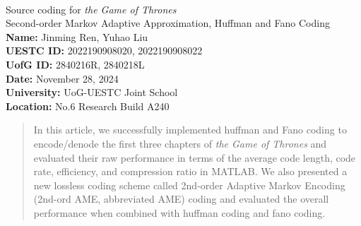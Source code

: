 \documentclass[12pt,twoside]{article}
\begin{document}
\begin{center}
    \textbf{ } \\
    \vspace{14em}
    {\huge \textsf{Source coding for \textit{the Game of Thrones}}} \\
    \vspace{1.5em}
    {\large \textsf{Second-order Markov Adaptive Approximation, Huffman and Fano Coding}} \\
    \vspace{1em}
    \vspace{1.5cm}
    \textbf{Name:} Jinming Ren, Yuhao Liu \\
    \vspace{0.5em}
    \textbf{UESTC ID:} 2022190908020, 2022190908022 \\
    \vspace{0.5em}
    \textbf{UofG ID:} 2840216R, 2840218L \\
    \vspace{0.5em}
    \textbf{Date:} November 28, 2024 \\
    \vspace{0.5em}
    \vspace{1cm}
    \textbf{University:} UoG-UESTC Joint School \\
    \vspace{0.5em}
    \textbf{Location:} No.6 Research Build A240 \\
    \vspace{2cm}
\end{center}

\newpage
\tableofcontents


\listoffigures
\listoftables
\newpage

\begin{abstract}
    In this article, we successfully implemented huffman and Fano coding to encode/denode the first three chapters of \textit{the Game of Thrones} and evaluated their raw performance in terms of the average code length, code rate, efficiency, and compression ratio in MATLAB. We also presented a new lossless coding scheme called 2nd-order Adaptive Markov Encoding (2nd-ord AME, abbreviated AME) coding and evaluated the overall performance when combined with huffman coding and fano coding.
\end{abstract}
\end{document}
